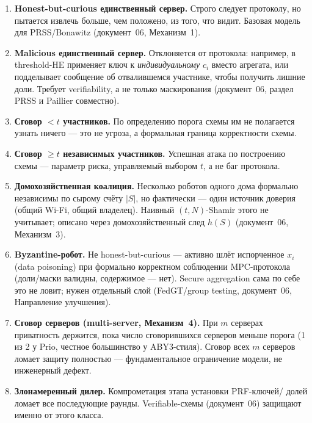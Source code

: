 \documentclass[11pt]{article}
\begin{document}
\begin{enumerate}[label=\textbf{A\arabic*.}, leftmargin=1.6cm]
  \item \textbf{Honest-but-curious единственный сервер.} Строго следует протоколу,
    но пытается извлечь больше, чем положено, из того, что видит. Базовая модель
    для PRSS/Bonawitz (документ~06, Механизм~1).
  \item \textbf{Malicious единственный сервер.} Отклоняется от протокола: например,
    в threshold-HE применяет ключ к \emph{индивидуальному} $c_i$ вместо агрегата,
    или подделывает сообщение об отвалившемся участнике, чтобы получить лишние
    доли. Требует verifiability, а не только маскирования (документ~06, раздел
    \guillemotleft PRSS и Paillier совместно\guillemotright).
  \item \textbf{Сговор $<t$ участников.} По определению порога схемы им не
    полагается узнать ничего — это не угроза, а формальная граница корректности
    схемы.
  \item \textbf{Сговор $\ge t$ независимых участников.} Успешная атака по
    построению схемы — параметр риска, управляемый выбором $t$, а не баг протокола.
  \item \textbf{Домохозяйственная коалиция.} Несколько роботов одного дома
    формально независимы по сырому счёту $|S|$, но фактически — один источник
    доверия (общий Wi-Fi, общий владелец). Наивный $(t,N)$-Shamir этого не
    учитывает; описано через домохозяйственный след $h(S)$ (документ~06,
    Механизм~3).
  \item \textbf{Byzantine-робот.} Не honest-but-curious — активно шлёт испорченное
    $x_i$ (data poisoning) при формально корректном соблюдении MPC-протокола
    (доли/маски валидны, содержимое — нет). Secure aggregation сама по себе это не
    ловит; нужен отдельный слой (FedGT/group testing, документ~06, \guillemotleft
    Направление улучшения\guillemotright).
  \item \textbf{Сговор серверов (multi-server, Механизм~4).} При $m$ серверах
    приватность держится, пока число сговорившихся серверов меньше порога (1 из 2
    у Prio, честное большинство у ABY3-стиля). Сговор всех $m$ серверов ломает
    защиту полностью — фундаментальное ограничение модели, не инженерный дефект.
  \item \textbf{Злонамеренный дилер.} Компрометация этапа установки PRF-ключей/
    долей ломает все последующие раунды. Verifiable-схемы (документ~06) защищают
    именно от этого класса.
\end{enumerate}
\end{document}
